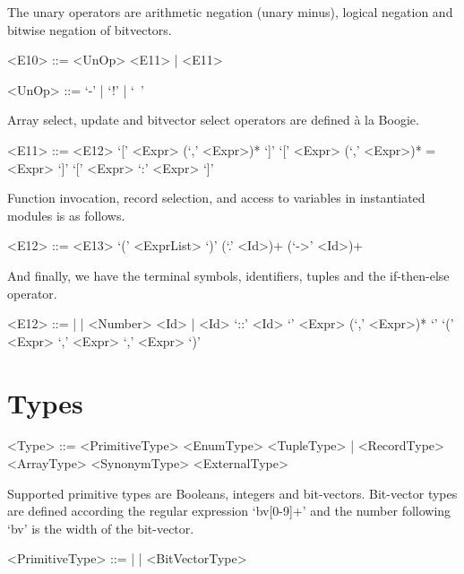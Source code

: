 The unary operators are arithmetic negation (unary minus), logical negation and bitwise negation of bitvectors.
\begin{grammar}
    <E10> ::= <UnOp> <E11> | <E11>

    <UnOp> ::= `-' | `!' | `~'
\end{grammar}

Array select, update and bitvector select operators are defined \`a la Boogie.
\begin{grammar}
    <E11> ::= <E12> `[' <Expr> (`,' <Expr>)* `]'
           `[' <Expr> (`,' <Expr>)* = <Expr> `]'
           `[' <Expr> `:' <Expr> `]'
\end{grammar}

Function invocation, record selection, and access to variables in instantiated modules is as follows.
\begin{grammar}
    <E12> ::=  <E13> `(' <ExprList> `)'
           (`.' <Id>)+
           (`->' <Id>)+
\end{grammar}

And finally, we have the terminal symbols, identifiers, tuples and the if-then-else operator.
\begin{grammar}
    <E12> ::=  |  | <Number>
          \alt <Id> | <Id> `::' <Id>
          \alt `{' <Expr> (`,' <Expr>)* `}'
          \alt {} `(' <Expr> `,' <Expr> `,' <Expr> `)'
\end{grammar}

\section{Types}

\begin{grammar}
<Type> ::= <PrimitiveType> 
       \alt <EnumType> 
       \alt <TupleType> | <RecordType> 
       \alt <ArrayType> 
       \alt <SynonymType> 
       \alt <ExternalType> 
\end{grammar}

Supported primitive types are Booleans, integers and bit-vectors. Bit-vector types are defined according the regular expression `bv[0-9]+' and the number following `bv' is the width of the bit-vector.

\begin{grammar}
    <PrimitiveType> ::=  |  | <BitVectorType>
\end{grammar}

